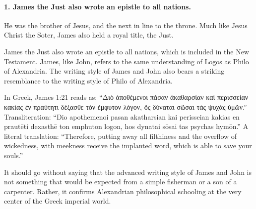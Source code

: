 \paragraph{1.
James the Just also wrote an epistle to all nations.}\label{par:james-the-just-also-wrote-an-epistle-to-all-nations.}

He was the brother of Jesus, and the next in line to the throne.
Much like Jesus Christ the Soter, James also held a royal title, the Just.

James the Just also wrote an epistle to all nations, which is included in the New Testament.
James, like John, refers to the same understanding of Logos as Philo of Alexandria.
The writing style of James and John also bears a striking resemblance to the writing style of Philo of Alexandria.

In Greek, James 1:21 reads as:
``Διὸ ἀποθέμενοι πάσαν ἀκαθαρσίαν καὶ περισσείαν κακίας ἐν πραΰτητι δέξασθε τὸν ἐμφυτον λόγον, ὃς δύναται σῶσαι τὰς ψυχὰς ὑμῶν.''
Transliteration: ``Dio apothemenoi pasan akatharsian kai perisseian kakias en prautēti dexasthē ton emphuton logon, hos dynatai sōsai tas psychas hymōn.''
A literal translation: ``Therefore, putting away all filthiness and the overflow of wickedness, with meekness receive the implanted word, which is able to save your souls.''

It should go without saying that the advanced writing style of James and John is not something that would be expected from a simple fisherman or a son of a carpenter.
Rather, it confirms Alexandrian philosophical schooling at the very center of the Greek imperial world.
